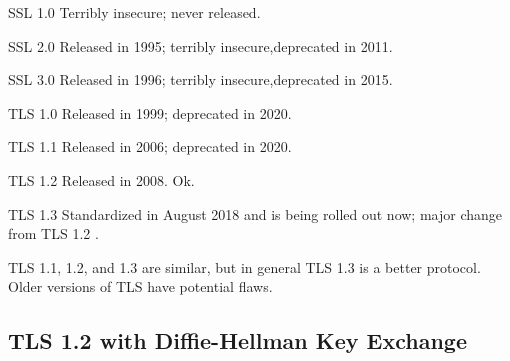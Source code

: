 \documentclass[11pt]{article} %
\begin{document}
\smallskip
{\parindent0pt SSL 1.0 Terribly insecure; never released.}

\smallskip
{\parindent0pt SSL 2.0 Released in 1995; terribly insecure,deprecated in 2011.}

\smallskip
{\parindent0pt SSL 3.0  Released in 1996; terribly insecure,deprecated in 2015.}

\smallskip
{\parindent0pt TLS 1.0 Released in 1999; deprecated in 2020.}

\smallskip
{\parindent0pt TLS 1.1 Released in 2006; deprecated in 2020.}

\smallskip
{\parindent0pt TLS 1.2 Released in 2008. Ok.}

\smallskip
{\parindent0pt TLS 1.3 Standardized in August 2018 and is being rolled out now;
major change from TLS 1.2 .}

\bigskip
TLS 1.1, 1.2,  and 1.3 are similar, but in general TLS 1.3 is a better protocol.
Older versions of TLS have potential flaws.

\subsection{TLS 1.2 with Diffie-Hellman Key Exchange}
\end{document}
